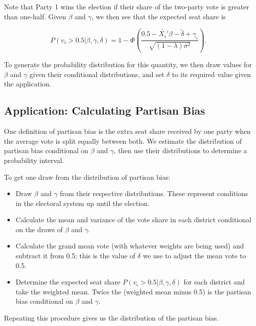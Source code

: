 \documentclass[12pt]{article}
\begin{document}
Note that Party 1 wins the election if their share of the two-party vote is greater than one-half. Given $\beta$ and $\gamma$, we then see that the expected seat share is

\[ P(v_i>0.5|\beta,\gamma,\delta) = 1-\Phi\left( \frac{0.5-\tilde{X_i'}\beta-\tilde{\delta} + \gamma_i}{\sqrt{(1-\lambda) \sigma^2}} \right). \]

To generate the probability distribution for this quantity, we then draw values for $\beta$ and $\gamma$ given their conditional distributions, and set $\delta$ to its required value given the application.

\subsection*{Application: Calculating Partisan Bias}

One definition of partisan bias is the extra seat share received by one party when the average vote is split equally between both. We estimate the distribution of partisan bias conditional on $\beta$ and $\gamma$, then use their distributions to determine a probability interval.

To get one draw from the distribution of partisan bias:

\begin{itemize}

\item Draw $\beta$ and $\gamma$ from their respective distributions. These represent conditions in the electoral system up until the election.

\item Calculate the mean and variance of the vote share in each district conditional on the draws of $\beta$ and $\gamma$.

\item Calculate the grand mean vote (with whatever weights are being used) and subtract it from 0.5; this is the value of $\delta$ we use to adjust the mean vote to 0.5.

\item Determine the expected seat share $P(v_i>0.5|\beta,\gamma,\delta)$ for each district and take the weighted mean. Twice the (weighted mean minus 0.5) is the partisan bias conditional on $\beta$ and $\gamma$.

\end{itemize}

Repeating this procedure gives us the distribution of the partisan bias.
\end{document}
